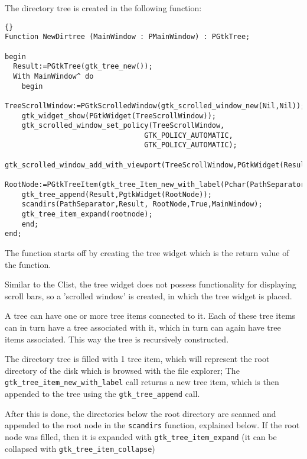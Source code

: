 \documentclass[10pt]{article}
\begin{document}
The directory tree is created in the following function:
\begin{lstlisting}{}
Function NewDirtree (MainWindow : PMainWindow) : PGtkTree;
 
begin
  Result:=PGtkTree(gtk_tree_new());
  With MainWindow^ do
    begin
    TreeScrollWindow:=PGtkScrolledWindow(gtk_scrolled_window_new(Nil,Nil));
    gtk_widget_show(PGtkWidget(TreeScrollWindow));
    gtk_scrolled_window_set_policy(TreeScrollWindow,
                                 GTK_POLICY_AUTOMATIC,
                                 GTK_POLICY_AUTOMATIC);
    gtk_scrolled_window_add_with_viewport(TreeScrollWindow,PGtkWidget(Result));
    RootNode:=PGtkTreeItem(gtk_tree_Item_new_with_label(Pchar(PathSeparator)));
    gtk_tree_append(Result,PgtkWidget(RootNode));
    scandirs(PathSeparator,Result, RootNode,True,MainWindow);
    gtk_tree_item_expand(rootnode);
    end;
end;                                                                            
\end{lstlisting}
The function starts off by creating the tree widget which is the return
value of the function.

Similar to the Clist, the tree widget does not possess functionality 
for displaying scroll bars, so a 'scrolled window' is created, 
in which the tree widget is placed. 

A tree can have one or more tree items connected to it. Each of these tree
items can in turn have a tree associated with it, which in turn can again
have tree items associated. This way the tree is recursively constructed.

The directory tree is filled with 1 tree item, which will represent the root
directory of the disk which is browsed with the file explorer; The
\lstinline|gtk_tree_item_new_with_label| call returns a new tree item,
which is then appended to the tree using the \lstinline|gtk_tree_append|
call.

After this is done, the directories below the root directory are scanned and
appended to the root node in the \lstinline|scandirs| function, explained
below. If the root node was filled, then it is expanded with
\lstinline|gtk_tree_item_expand| (it can be collapsed with
\lstinline|gtk_tree_item_collapse|)
\end{document}
